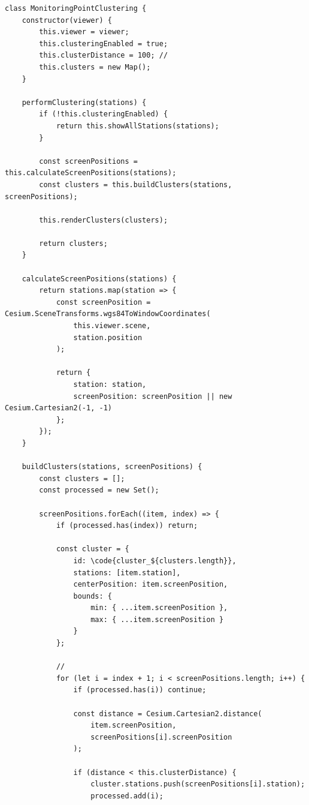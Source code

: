 \begin{lstlisting}[style=javascript]
class MonitoringPointClustering {
    constructor(viewer) {
        this.viewer = viewer;
        this.clusteringEnabled = true;
        this.clusterDistance = 100; // 
        this.clusters = new Map();
    }
    
    performClustering(stations) {
        if (!this.clusteringEnabled) {
            return this.showAllStations(stations);
        }
        
        const screenPositions = this.calculateScreenPositions(stations);
        const clusters = this.buildClusters(stations, screenPositions);
        
        this.renderClusters(clusters);
        
        return clusters;
    }
    
    calculateScreenPositions(stations) {
        return stations.map(station => {
            const screenPosition = Cesium.SceneTransforms.wgs84ToWindowCoordinates(
                this.viewer.scene,
                station.position
            );
            
            return {
                station: station,
                screenPosition: screenPosition || new Cesium.Cartesian2(-1, -1)
            };
        });
    }
    
    buildClusters(stations, screenPositions) {
        const clusters = [];
        const processed = new Set();
        
        screenPositions.forEach((item, index) => {
            if (processed.has(index)) return;
            
            const cluster = {
                id: \code{cluster_${clusters.length}},
                stations: [item.station],
                centerPosition: item.screenPosition,
                bounds: {
                    min: { ...item.screenPosition },
                    max: { ...item.screenPosition }
                }
            };
            
            // 
            for (let i = index + 1; i < screenPositions.length; i++) {
                if (processed.has(i)) continue;
                
                const distance = Cesium.Cartesian2.distance(
                    item.screenPosition,
                    screenPositions[i].screenPosition
                );
                
                if (distance < this.clusterDistance) {
                    cluster.stations.push(screenPositions[i].station);
                    processed.add(i);
                    

\end{lstlisting}
